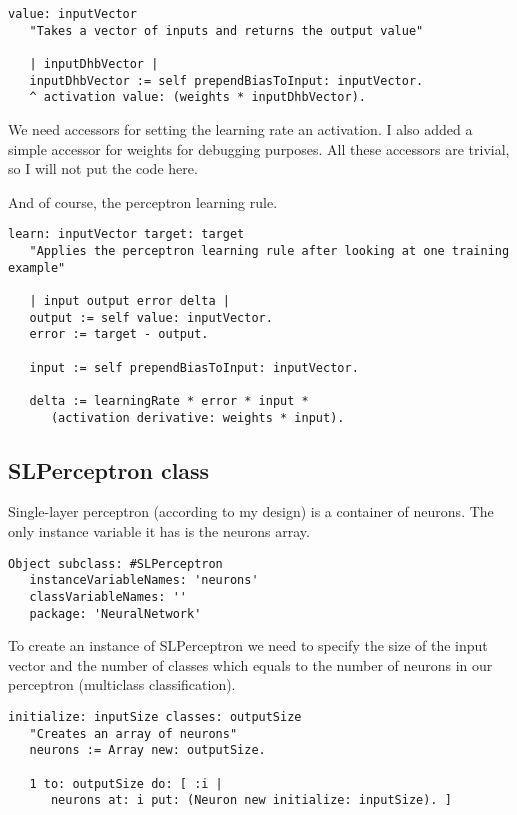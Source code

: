 \begin{lstlisting}
value: inputVector
   "Takes a vector of inputs and returns the output value"
 
   | inputDhbVector |
   inputDhbVector := self prependBiasToInput: inputVector.
   ^ activation value: (weights * inputDhbVector).
\end{lstlisting}

We need accessors for setting the learning rate an activation. I also added a simple accessor for weights for debugging purposes. All these accessors are trivial, so I will not put the code here.

And of course, the perceptron learning rule.

\begin{lstlisting}
learn: inputVector target: target
   "Applies the perceptron learning rule after looking at one training example"
 
   | input output error delta |
   output := self value: inputVector.
   error := target - output.
 
   input := self prependBiasToInput: inputVector.
  
   delta := learningRate * error * input * 
      (activation derivative: weights * input).
\end{lstlisting}
      
\subsection{SLPerceptron class}
Single-layer perceptron (according to my design) is a container of neurons. The only instance variable it has is the neurons array.

\begin{lstlisting}
Object subclass: #SLPerceptron
   instanceVariableNames: 'neurons'
   classVariableNames: ''
   package: 'NeuralNetwork'
\end{lstlisting}

To create an instance of SLPerceptron we need to specify the size of the input vector and the number of classes which equals to the number of neurons in our perceptron (multiclass classification).

\begin{lstlisting}
initialize: inputSize classes: outputSize
   "Creates an array of neurons"
   neurons := Array new: outputSize.
 
   1 to: outputSize do: [ :i |
      neurons at: i put: (Neuron new initialize: inputSize). ]
\end{lstlisting}

